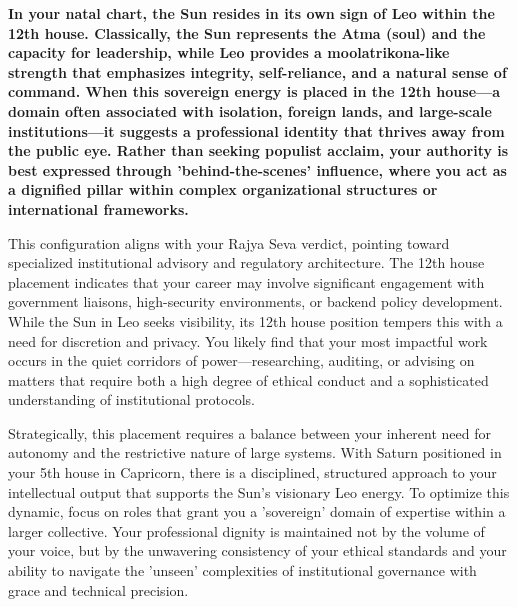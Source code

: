 
\label{topic43}

{\fontsize{9.5}{13.8}\selectfont\bfseries\color{DeepSlate} In your natal chart, the Sun resides in its own sign of Leo within the 12th house. Classically, the Sun represents the Atma (soul) and the capacity for leadership, while Leo provides a moolatrikona-like strength that emphasizes integrity, self-reliance, and a natural sense of command. When this sovereign energy is placed in the 12th house---a domain often associated with isolation, foreign lands, and large-scale institutions---it suggests a professional identity that thrives away from the public eye. Rather than seeking populist acclaim, your authority is best expressed through 'behind-the-scenes' influence, where you act as a dignified pillar within complex organizational structures or international frameworks.}\par\vspace{2mm}

{\fontsize{9}{13}\selectfont This configuration aligns with your Rajya Seva verdict, pointing toward specialized institutional advisory and regulatory architecture. The 12th house placement indicates that your career may involve significant engagement with government liaisons, high-security environments, or backend policy development. While the Sun in Leo seeks visibility, its 12th house position tempers this with a need for discretion and privacy. You likely find that your most impactful work occurs in the quiet corridors of power---researching, auditing, or advising on matters that require both a high degree of ethical conduct and a sophisticated understanding of institutional protocols.}\par\vspace{1.8mm}

{\fontsize{9}{13}\selectfont Strategically, this placement requires a balance between your inherent need for autonomy and the restrictive nature of large systems. With Saturn positioned in your 5th house in Capricorn, there is a disciplined, structured approach to your intellectual output that supports the Sun's visionary Leo energy. To optimize this dynamic, focus on roles that grant you a 'sovereign' domain of expertise within a larger collective. Your professional dignity is maintained not by the volume of your voice, but by the unwavering consistency of your ethical standards and your ability to navigate the 'unseen' complexities of institutional governance with grace and technical precision.}\par\vspace{1.8mm}


